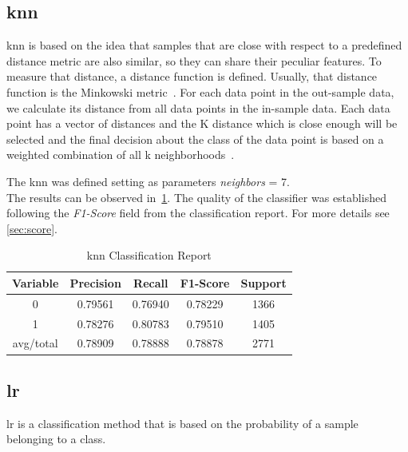 \subsection{\acf{knn}}
\ac{knn} is based on the idea that samples that are close with respect to a predefined distance metric are also similar, so they can share their peculiar features. To measure that distance, a distance function is defined. Usually, that distance function is the Minkowski metric~\cite{countvect1}. For each data point in the out-sample data, we calculate its distance from all data points in the in-sample data. Each data point has a vector of distances and the K distance which is close enough will be selected and the final decision about the class of the data point is based on a weighted combination of all k neighborhoods~\cite{svm}.\par
The \ac{knn} was defined setting as parameters \textit{neighbors} = 7.\\
The results can be observed in~\cref{tab:knn1}. The quality of the classifier was established following the \textit{F1-Score} field from the classification report. For more details see \cref{sec:score}. 
\begin{table}[h!]
	\centering
	\begin{tabular}{||c c c c c||} 
		\hline
		Variable & Precision & Recall & F1-Score & Support \\ [0.5ex] 
		\hline\hline
		0 & 0.79561 & 0.76940 & 0.78229 & 1366 \\ 
		1 & 0.78276 & 0.80783 & 0.79510 & 1405 \\
		avg/total & 0.78909 & 0.78888 & 0.78878 & 2771 \\
		[1ex] 
		\hline
	\end{tabular}
	\caption{\acl{knn} Classification Report}
	\label{tab:knn1}
\end{table}
\subsection{\acf{lr}}
 \ac{lr} is a classification method that is based on the probability of a sample belonging to a class.

